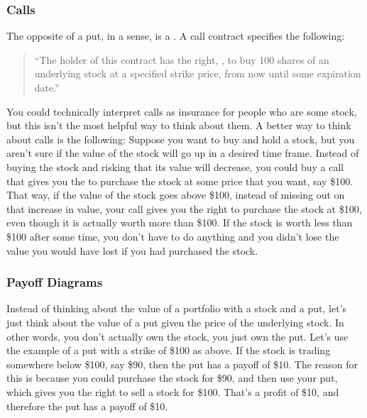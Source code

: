 \documentclass[letterpaper,10pt,english]{jupyterBook}
\begin{document}
\subsubsection{Calls}
\label{\detokenize{content/10-finance/options:calls}}
\sphinxAtStartPar
The opposite of a put, in a sense, is a . A call contract specifies the following:
\begin{quote}

\sphinxAtStartPar
“The holder of this contract has the right, , to buy 100 shares of an underlying stock at a specified strike price, from now until some expiration date.”
\end{quote}

\sphinxAtStartPar
You could technically interpret calls as insurance for people who are  some stock, but this isn’t the most helpful way to think about them. A better way to think about calls is the following: Suppose you want to buy and hold a stock, but you aren’t sure if the value of the stock will go up in a desired time frame. Instead of buying the stock and risking that its value will decrease, you could buy a call that gives you the  to purchase the stock at some price that you want, say \$100. That way, if the value of the stock goes above \$100, instead of missing out on that increase in value, your call gives you the right to purchase the stock at \$100, even though it is actually worth more than \$100. If the stock is worth less than \$100 after some time, you don’t have to do anything and you didn’t lose the value you would have lost if you had purchased the stock.


\subsubsection{Payoff Diagrams}
\label{\detokenize{content/10-finance/options:payoff-diagrams}}
\sphinxAtStartPar
Instead of thinking about the value of a portfolio with a stock and a put, let’s just think about the value of a put given the price of the underlying stock. In other words, you don’t actually own the stock, you just own the put. Let’s use the example of a put with a strike of \$100 as above. If the stock is trading somewhere below \$100, say \$90, then the put has a payoff of \$10. The reason for this is because you could purchase the stock for \$90, and then use your put, which gives you the right to sell a stock for \$100. That’s a profit of \$10, and therefore the put has a payoff of \$10.
\end{document}
